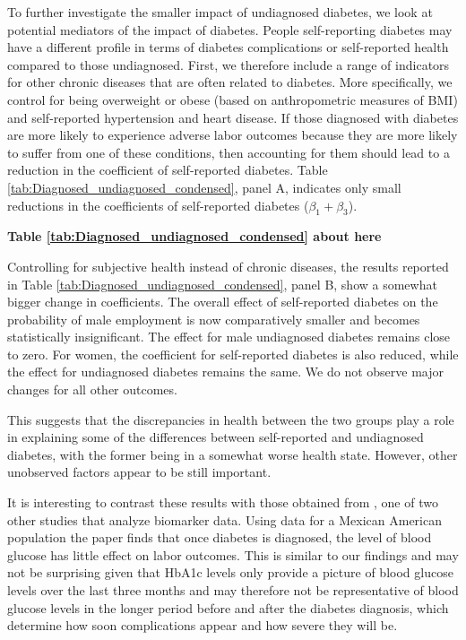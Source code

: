 \documentclass[12pt,english]{article}
\begin{document}
To further investigate the smaller impact of undiagnosed diabetes, we look at potential mediators of the impact of diabetes. People self-reporting diabetes may have a different profile in terms of diabetes complications or self-reported health compared to those undiagnosed. First, we therefore include a range of indicators for other chronic diseases that are often related to diabetes. More specifically, we control for being overweight or obese (based on anthropometric measures of \ac{BMI}) and self-reported hypertension and heart disease. If those diagnosed with diabetes are more likely to experience adverse labor outcomes because they are more likely to suffer from one of these conditions, then accounting for them should lead to a reduction in the coefficient of self-reported diabetes. Table \ref{tab:Diagnosed_undiagnosed_condensed}, panel A, indicates only small reductions in the coefficients of self-reported diabetes ($\beta_{1}+\beta_{3}$). 

\begin{center}
	\textbf{Table \ref{tab:Diagnosed_undiagnosed_condensed} about here}
\end{center}

Controlling for subjective health instead of chronic diseases, the results reported in Table \ref{tab:Diagnosed_undiagnosed_condensed}, panel B, show a somewhat bigger change in coefficients. The overall effect of self-reported diabetes on the probability of male employment is now comparatively smaller and becomes statistically insignificant. The effect for male undiagnosed diabetes remains close to zero. For women, the coefficient for self-reported diabetes is also reduced, while the effect for undiagnosed diabetes remains the same. We do not observe major changes for all other outcomes.   

This suggests that the  discrepancies in health between the two groups play a role in explaining some of the differences between self-reported and undiagnosed diabetes, with the former being in a somewhat worse health state. However, other unobserved factors appear to be still important.

It is interesting to contrast these results with those obtained from \textcite{BrownIII2011}, one of two other studies that analyze biomarker data. Using data for a Mexican American population the paper finds that once diabetes is diagnosed, the level of blood glucose has
little effect on labor outcomes. This is similar to our findings and may not be surprising given that HbA1c levels only provide a picture of blood glucose levels over the last three months and may therefore not be representative of blood glucose levels in the longer period
before and after the diabetes diagnosis, which determine how soon complications appear and how severe they will be.
\end{document}
